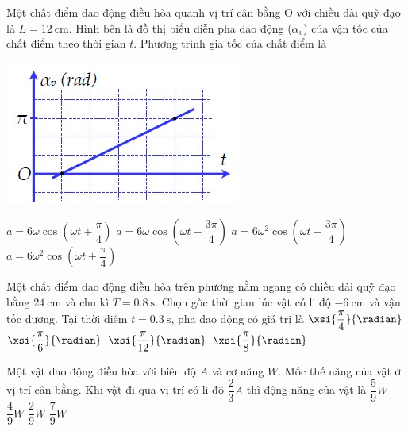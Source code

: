 \begin{ex}
	Một chất điểm dao động điều hòa quanh vị trí cân bằng O với chiều dài quỹ đạo là $L=\SI{12}{\centi\meter}$. Hình bên là đồ thị biểu diễn pha dao động ($\alpha_v$) của vận tốc  của chất điểm theo thời gian $t$. Phương trình gia tốc của chất điểm là
	\begin{center}
		\includegraphics[width=0.35\linewidth]{../figs/D11-004-2}
	\end{center}
	\choice
	{$a=6\omega\cos\left(\omega t+\dfrac{\pi}{4}\right)$}
	{$a=6\omega\cos\left(\omega t-\dfrac{3\pi}{4}\right)$}
	{$a=6\omega^2\cos\left(\omega t-\dfrac{3\pi}{4}\right)$}
	{\True $a=6\omega^2\cos\left(\omega t+\dfrac{\pi}{4}\right)$}
\end{ex}
\begin{ex}
	Một chất điểm dao động điều hòa trên phương nằm ngang có chiều dài quỹ đạo bằng $\SI{24}{\centi\meter}$ và chu kì $T=\SI{0.8}{\second}$. Chọn gốc thời gian lúc vật có li độ $\SI{-6}{\centi\meter}$ và vận tốc dương. Tại thời điểm $t =\SI{0.3}{\second}$, pha dao động có giá trị là 
	\choice
	{$\xsi{\dfrac{\pi}{4}}{\radian}$}
	{$\xsi{\dfrac{\pi}{6}}{\radian}$}
	{\True $\xsi{\dfrac{\pi}{12}}{\radian}$}
	{$\xsi{\dfrac{\pi}{8}}{\radian}$}
\end{ex}
\begin{ex}
Một vật dao động điều hòa với biên độ $A$ và cơ năng $W$. Mốc thế năng của vật ở vị trí cân bằng. Khi vật đi qua vị trí có li độ  $\dfrac{2}{3}A$ thì động năng của vật là	
	\choice
	{\True $\dfrac{5}{9}W$}
	{$\dfrac{4}{9}W$}
	{$\dfrac{2}{9}W$}
	{$\dfrac{7}{9}W$}
	\loigiai{}
\end{ex}
